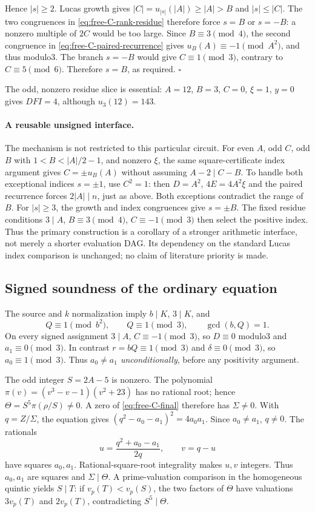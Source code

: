 Hence $|s|\ge2$. Lucas growth gives
$|C|=u_{|s|}(|A|)\ge|A|>B$ and $|s|\le|C|$.
The two congruences in \eqref{eq:free-C-rank-residue} therefore force
$s=B$ or $s=-B$: a nonzero multiple of $2C$ would be too large.
Since $B\equiv3\pmod4$, the second congruence in
\eqref{eq:free-C-paired-recurrence} gives $u_B(A)\equiv-1\pmod{A^2}$,
and thus modulo3. The branch $s=-B$ would give $C\equiv1\pmod3$,
contrary to $C\equiv5\pmod6$. Therefore $s=B$, as required.
\hfill$\square$

The odd, nonzero residue slice is essential: $A=12$, $B=3$, $C=0$, $\xi=1$, $y=0$ gives $DFI=4$, although $u_3(12)=143$.

\paragraph{A reusable unsigned interface.}
The mechanism is not restricted to this particular circuit. For even $A$,
odd $C$, odd $B$ with $1<B<|A|/2-1$, and nonzero $\xi$, the same
square-certificate index argument gives $C=\pm u_B(A)$ without assuming
$A-2\mid C-B$. To handle both exceptional indices $s=\pm1$, use
$C^2=1$: then $D=A^2$, $4E=4A^2\xi$ and the paired recurrence forces
$2|A|\mid n$, just as above. Both exceptions contradict the range of $B$.
For $|s|\ge3$, the growth and index congruences give $s=\pm B$.
The fixed residue conditions $3\mid A$, $B\equiv3\pmod4$,
$C\equiv-1\pmod3$ then select the positive index. Thus the primary
construction is a corollary of a stronger arithmetic interface, not merely
a shorter evaluation DAG. Its dependency on the standard Lucas index
comparison is unchanged; no claim of literature priority is made.

\subsection{Signed soundness of the ordinary equation}

The source and $k$ normalization imply $b\mid K$, $3\mid K$, and
\[
 Q\equiv1\pmod{b^2},\qquad Q\equiv1\pmod3,\qquad \gcd(b,Q)=1.
\]
On every signed assignment $3\mid A$, $C\equiv-1\pmod3$, so $D\equiv0$
modulo3 and $a_1\equiv0\pmod3$. In contrast $r=bQ\equiv1\pmod3$ and
$\delta\equiv0\pmod3$, so $a_0\equiv1\pmod3$. Thus
\emph{$a_0\ne a_1$ unconditionally}, before any positivity argument.

The odd integer $S=2A-5$ is nonzero. The polynomial
$\pi(v)=(v^3-v-1)(v^2+23)$ has no rational root; hence
$\Theta=S^5\pi(\rho/S)\ne0$. A zero of
\eqref{eq:free-C-final} therefore has $\Sigma\ne0$. With $q=Z/\Sigma$,
the equation gives $(q^2-a_0-a_1)^2=4a_0a_1$.
Since $a_0\ne a_1$, $q\ne0$. The rationals
\[
 u=\frac{q^2+a_0-a_1}{2q},\qquad v=q-u
\]
have squares $a_0,a_1$. Rational-square-root integrality makes $u,v$
integers. Thus $a_0,a_1$ are squares and $\Sigma\mid\Theta$.
A prime-valuation comparison in the homogeneous quintic yields $S\mid T$:
if $v_p(T)<v_p(S)$, the two factors of $\Theta$ have valuations
$3v_p(T)$ and $2v_p(T)$, contradicting $S^5\mid\Theta$.

